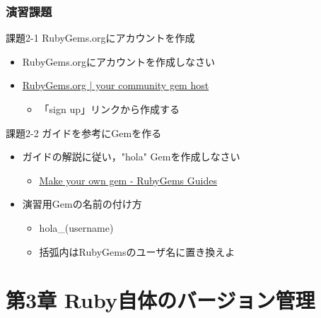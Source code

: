 \documentclass[t, aspectratio=169]{beamer}
\begin{document}
\section{演習課題}
\label{sec-2-4}
\begin{frame}[label=sec-2-4-1]{課題2-1 RubyGems.orgにアカウントを作成}
\begin{itemize}
\item RubyGems.orgにアカウントを作成しなさい
\item \href{https://rubygems.org/}{RubyGems.org | your community gem host}
\begin{itemize}
\item 「sign up」リンクから作成する
\end{itemize}
\end{itemize}
\end{frame}
\begin{frame}[label=sec-2-4-2]{課題2-2 ガイドを参考にGemを作る}
\begin{itemize}
\item ガイドの解説に従い，"hola" Gemを作成しなさい
\begin{itemize}
\item \href{http://guides.rubygems.org/make-your-own-gem/}{Make your own gem - RubyGems Guides}
\end{itemize}
\item 演習用Gemの名前の付け方
\begin{itemize}
\item hola\_(username)
\item 括弧内はRubyGemsのユーザ名に置き換えよ
\end{itemize}
\end{itemize}
\end{frame}
\part{第3章 Ruby自体のバージョン管理}
\label{sec-3}
\end{document}
